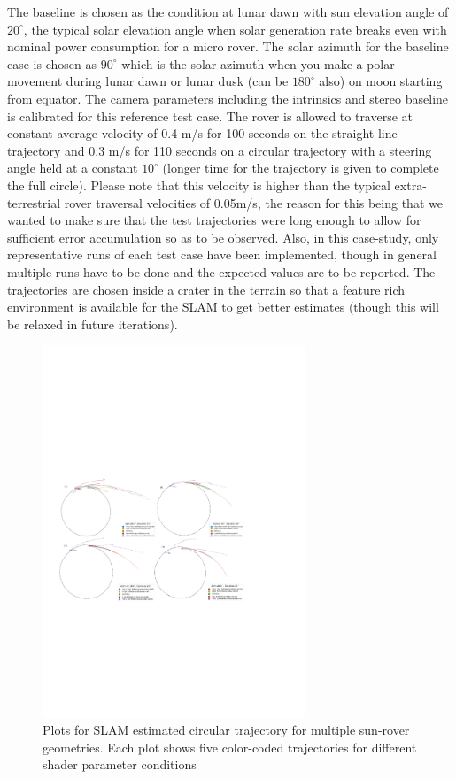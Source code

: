 \documentclass[a4paper, 10pt, conference]{ieeeconf}      %
\begin{document}
The baseline is chosen as the condition at lunar dawn with sun elevation angle of $20^\circ$, the typical solar elevation angle when solar generation rate breaks even with nominal power consumption for a micro rover. The solar azimuth for the baseline case is chosen as $90^\circ$ which is the solar azimuth when you make a polar movement during lunar dawn or lunar dusk (can be $180^\circ$ also) on moon starting from equator. The camera parameters including the intrinsics and stereo baseline is calibrated for this reference test case. The rover is allowed to traverse at constant average velocity of 0.4 m/s for 100 seconds on the straight line trajectory and 0.3 m/s for 110 seconds on a circular trajectory with a steering angle held at a constant $10^\circ$ (longer time for the trajectory is given to complete the full circle). Please note that this velocity is higher than the typical extra-terrestrial rover traversal velocities of 0.05m/s, the reason for this being that we wanted to make sure that the test trajectories were long enough to allow for sufficient error accumulation so as to be observed. Also, in this case-study, only representative runs of each test case have been implemented, though in general multiple runs have to be done and the expected values are to be reported. The trajectories are chosen inside a crater in the terrain so that a feature rich environment is available for the SLAM to get better estimates (though this will be relaxed in future iterations).
\begin{figure}[!htb]
      \centering
        \includegraphics[width=0.7\textwidth]{Figures/circle_plots.pdf}
      \caption{Plots for SLAM estimated circular trajectory for multiple sun-rover geometries. Each plot shows five color-coded trajectories for different shader parameter conditions}
      \label{circle_plots}
\end{figure}
\end{document}
